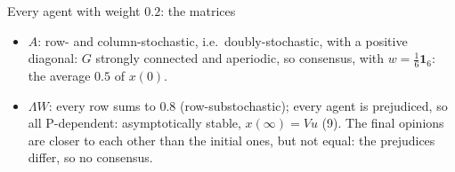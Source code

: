 \begin{frame}[label=m-fj-matrices-all]{Every agent with weight $0.2$: the matrices}
  \scriptsize
  \begin{itemize}
    \setlength{\itemsep}{1pt}
    \item $A$: row- and column-stochastic, i.e.\ doubly-stochastic, with a positive diagonal:
          $G$ strongly connected and aperiodic, so consensus, with $w = \frac16\mathbf{1}_6$:
          the average $0.5$ of $x(0)$.
    \item $\Lambda W$: every row sums to $0.8$ (row-substochastic); every agent is
          prejudiced, so all P-dependent: asymptotically stable, $x(\infty) = Vu$ (9).
          The final opinions are closer to each other than the initial ones, but not
          equal: the prejudices differ, so no consensus.
  \end{itemize}
\end{frame}

